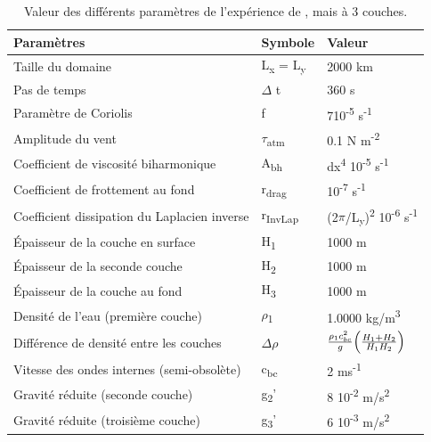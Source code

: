 \documentclass[10pt]{article}
\numberwithin{equation}{section}
\begin{document}
\begin{table}[htbp]
\caption{\label{tab:org3b16ce0}Valeur des différents paramètres de l'expérience de , mais à 3 couches.}
\centering
\begin{tabular}{lll}
\hline
\hline
Paramètres & Symbole & Valeur\\[0pt]
\hline
Taille du domaine & L\textsubscript{x} = L\textsubscript{y} & 2000 km\\[0pt]
Pas de temps & \(\Delta\) t & 360 s\\[0pt]
Paramètre de Coriolis & f & 7\texttimes{}10\textsuperscript{-5} s\textsuperscript{-1}\\[0pt]
Amplitude du vent & \(\tau\)\textsubscript{atm} & 0.1 N m\textsuperscript{-2}\\[0pt]
Coefficient de viscosité biharmonique & A\textsubscript{bh} & dx\textsuperscript{4} \texttimes{}10\textsuperscript{-5} s\textsuperscript{-1}\\[0pt]
Coefficient de frottement au fond & r\textsubscript{drag} & 10\textsuperscript{-7} s\textsuperscript{-1}\\[0pt]
Coefficient dissipation du Laplacien inverse & r\textsubscript{InvLap} & (2\(\pi\)/L\textsubscript{y})\textsuperscript{2} \texttimes{} 10\textsuperscript{-6} s\textsuperscript{-1}\\[0pt]
Épaisseur de la couche en surface & H\textsubscript{1} & 1000 m\\[0pt]
Épaisseur de la seconde couche & H\textsubscript{2} & 1000 m\\[0pt]
Épaisseur de la couche au fond & H\textsubscript{3} & 1000 m\\[0pt]
Densité de l'eau (première couche) & \(\rho\)\textsubscript{1} & 1.0000 kg/m\textsuperscript{3}\\[0pt]
Différence de densité entre les couches & \(\Delta \rho\) & \(\frac{\rho_1c_{bc}^2}{g}\qty(\frac{H_1+H_2}{H_1H_2})\)\\[0pt]
Vitesse des ondes internes (semi-obsolète) & c\textsubscript{bc} & 2 ms\textsuperscript{-1}\\[0pt]
Gravité réduite (seconde couche) & g\textsubscript{2}' & 8 \texttimes{} 10\textsuperscript{-2} m/s\textsuperscript{2}\\[0pt]
Gravité réduite (troisième couche) & g\textsubscript{3}' & 6 \texttimes{} 10\textsuperscript{-3} m/s\textsuperscript{2}\\[0pt]
\hline
\hline
\end{tabular}
\end{table}
\end{document}
